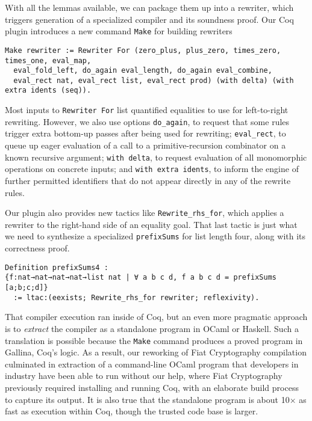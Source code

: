 \documentclass[a4paper,USenglish,cleveref,autoref,thm-restate]{lipics-v2021}
\begin{document}
With all the lemmas available, we can package them up into a rewriter, which triggers generation of a specialized compiler and its soundness proof.
Our Coq plugin introduces a new command \texttt{Make} for building rewriters
\begin{verbatim}
Make rewriter := Rewriter For (zero_plus, plus_zero, times_zero, times_one, eval_map,
  eval_fold_left, do_again eval_length, do_again eval_combine,
  eval_rect nat, eval_rect list, eval_rect prod) (with delta) (with extra idents (seq)).
\end{verbatim}
Most inputs to \texttt{Rewriter For} list quantified equalities to use for left-to-right rewriting.
However, we also use options \texttt{do_again}, to request that some rules trigger extra bottom-up passes after being used for rewriting; \texttt{eval_rect}, to queue up eager evaluation of a call to a primitive-recursion combinator on a known recursive argument; \texttt{with delta}, to request evaluation of all monomorphic operations on concrete inputs; and \texttt{with extra idents}, to inform the engine of further permitted identifiers that do not appear directly in any of the rewrite rules.

Our plugin also provides new tactics like \texttt{Rewrite_rhs_for}, which applies a rewriter to the right-hand side of an equality goal.
That last tactic is just what we need to synthesize a specialized \texttt{prefixSums} for list length four, along with its correctness proof.
\begin{verbatim}
Definition prefixSums4 :
{f:nat→nat→nat→nat→list nat | ∀ a b c d, f a b c d = prefixSums [a;b;c;d]}
  := ltac:(eexists; Rewrite_rhs_for rewriter; reflexivity).
\end{verbatim}

That compiler execution ran inside of Coq, but an even more pragmatic approach is to \emph{extract} the compiler as a standalone program in OCaml or Haskell.
Such a translation is possible because the \texttt{Make} command produces a proved program in Gallina, Coq's logic.
As a result, our reworking of Fiat Cryptography compilation culminated in extraction of a command-line OCaml program that developers in industry have been able to run without our help, where Fiat Cryptography previously required installing and running Coq, with an elaborate build process to capture its output.
It is also true that the standalone program is about 10$\times$ as fast as execution within Coq, though the trusted code base is larger.
\end{document}
